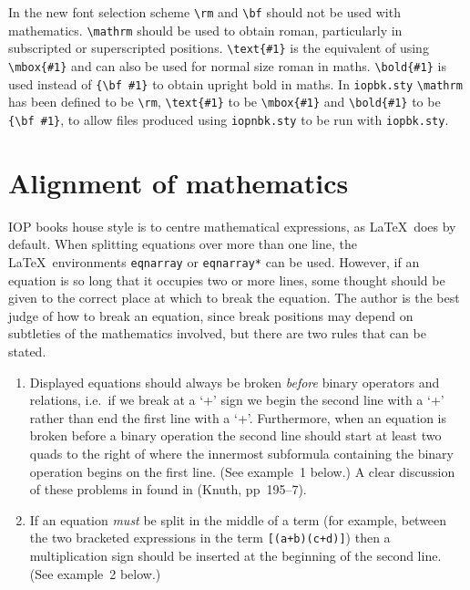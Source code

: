 In the new font selection scheme \verb"\rm" and \verb"\bf" should not be 
used with mathematics. \verb"\mathrm" should be used to obtain roman, 
particularly in subscripted
or superscripted positions. \verb"\text{#1}" is the equivalent of using
\verb"\mbox{#1}" and can also be used for normal size roman in maths.
\verb"\bold{#1}" is used instead of \verb"{\bf #1}" to obtain upright bold
in maths. In \verb"iopbk.sty" \verb"\mathrm" has been defined to be 
\verb"\rm", \verb"\text{#1}" to be \verb"\mbox{#1}" and \verb"\bold{#1}"
to be \verb"{\bf #1}", to allow files produced using \verb"iopnbk.sty" to
be run with \verb"iopbk.sty". 

\section{Alignment of mathematics}
IOP books house style is to centre 
mathematical expressions, as \LaTeX\ does
by default. 
When splitting equations over more than one line, the \LaTeX\ 
environments \verb"eqnarray" or \verb"eqnarray*" can be used. 
However, if an equation is so long that it occupies two or more lines, 
some thought should be given to the correct place at which to break 
the equation. The author is the best judge of how to break an 
equation, since break positions may depend on subtleties of the 
mathematics\index{mathematics} involved, but there are 
two rules that can be stated.
\begin{enumerate}
\item Displayed equations should always be broken {\it before} binary 
operators and relations, i.e.\ if we break at a `+' sign we begin the 
second line with a `+' rather than end the first line with a `+'. 
Furthermore, when an equation is broken before a binary operation the 
second line should start at least two quads to the right of where the 
innermost subformula containing the binary operation begins on the 
first line. (See example~1 below.) A clear discussion of these 
problems in found in (Knuth, pp~195--7).

\item If an equation {\it must} be split in the middle of a term (for 
example, between the two bracketed expressions in the term 
\verb"[(a+b)(c+d)]") then a multiplication sign should be inserted at the 
beginning of the second line. (See example~2 below.)
\end{enumerate}

